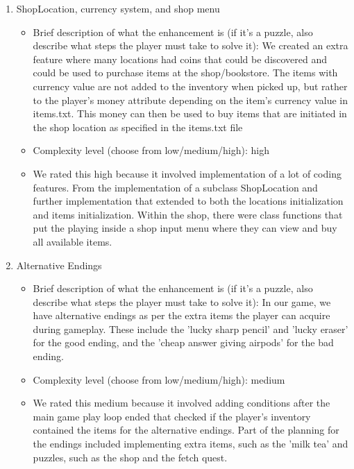 \documentclass[11pt]{article}
\begin{document}
\begin{enumerate}
\item ShopLocation, currency system, and shop menu
	\begin{itemize}
	\item Brief description of what the enhancement is (if it's a puzzle, also describe what steps the player must take to solve it): We created an extra feature where many locations had coins that could be discovered and could be used to purchase items at the shop/bookstore. The items with currency value are not added to the inventory when picked up, but rather to the player's money attribute depending on the item's currency value in items.txt. This money can then be used to buy items that are initiated in the shop location as specified in the items.txt file
	\item Complexity level (choose from low/medium/high): high
	\item  We rated this high because it involved implementation of a lot of coding features. From the implementation of a subclass ShopLocation and further implementation that extended to both the locations initialization and items initialization. Within the shop, there were class functions that put the playing inside a shop input menu where they can view and buy all available items.
	\end{itemize}
 
\item Alternative Endings
	\begin{itemize}
	\item Brief description of what the enhancement is (if it's a puzzle, also describe what steps the player must take to solve it): In our game, we have alternative endings as per the extra items the player can acquire during gameplay. These include the 'lucky sharp pencil' and 'lucky eraser' for the good ending, and the 'cheap answer giving airpods' for the bad ending.
	\item Complexity level (choose from low/medium/high): medium
	\item  We rated this medium because it involved adding conditions after the main game play loop ended that checked if the player's inventory contained the items for the alternative endings. Part of the planning for the endings included implementing extra items, such as the 'milk tea' and puzzles, such as the shop and the fetch quest.
	\end{itemize}
 

\end{enumerate}
\end{document}
